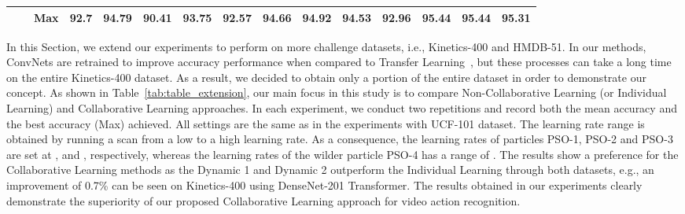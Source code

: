 \documentclass[fleqn,10pt]{wlscirep}
\begin{document}
\begin{table}[htb]
{\begin{tabular}{lll|clll|clllllll|}
\multicolumn{1}{|l|}{}                              & \multicolumn{1}{l|}{}                                                                                    & Max & \multicolumn{1}{l|}{92.7}                                                  & \multicolumn{1}{l|}{\textbf{94.79}}                                                 & \multicolumn{1}{l|}{90.41}                                                 & 93.75                                                                      & \multicolumn{1}{l|}{92.57}                                                 & \multicolumn{1}{l|}{94.66}                                                 & \multicolumn{1}{l|}{\textbf{94.92}}                                                 & \multicolumn{1}{l|}{94.53}                                                 & \multicolumn{1}{l|}{92.96}                                                 & \multicolumn{1}{l|}{\textbf{95.44}}                                                 & \multicolumn{1}{l|}{95.44}                                                 & 95.31                                                                      \\ \hline
\end{tabular}
}
\end{table} In this Section, we extend our experiments to perform on more challenge datasets, i.e., Kinetics-400 and HMDB-51. In our methods, ConvNets are retrained to improve accuracy performance when compared to Transfer Learning~\cite{phong2022pso,phong2020rethinking}, but these processes can take a long time on the entire Kinetics-400 dataset. As a result, we decided to obtain only a portion of the entire dataset in order to demonstrate our concept. As shown in Table~\ref{tab:table_extension}, our main focus in this study is to compare Non-Collaborative Learning (or Individual Learning) and Collaborative Learning approaches. In each experiment, we conduct two repetitions and record both the mean accuracy and the best accuracy (Max) achieved. All settings are the same as in the experiments with UCF-101 dataset. The learning rate range is obtained by running a scan from a low to a high learning rate. As a consequence, the learning rates of particles PSO-1, PSO-2 and PSO-3 are set at ,  and , respectively, whereas the learning rates of the wilder particle PSO-4 has a range of . The results show a preference for the Collaborative Learning methods as the Dynamic 1 and Dynamic 2 outperform the Individual Learning through both datasets, e.g., an improvement of 0.7\% can be seen on Kinetics-400 using DenseNet-201 Transformer. The results obtained in our experiments clearly demonstrate the superiority of our proposed Collaborative Learning approach for video action recognition.
\end{document}
